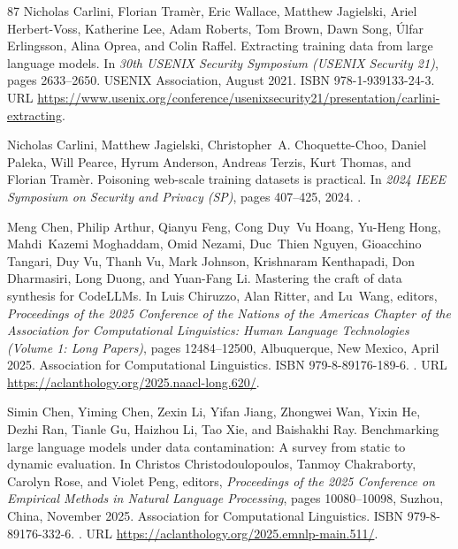 \begin{thebibliography}{87}
Nicholas Carlini, Florian Tram{\`e}r, Eric Wallace, Matthew Jagielski, Ariel Herbert-Voss, Katherine Lee, Adam Roberts, Tom Brown, Dawn Song, {\'U}lfar Erlingsson, Alina Oprea, and Colin Raffel.
\newblock Extracting training data from large language models.
\newblock In \emph{30th USENIX Security Symposium (USENIX Security 21)}, pages 2633--2650. USENIX Association, August 2021.
\newblock ISBN 978-1-939133-24-3.
\newblock URL \url{https://www.usenix.org/conference/usenixsecurity21/presentation/carlini-extracting}.

Nicholas Carlini, Matthew Jagielski, Christopher~A. Choquette-Choo, Daniel Paleka, Will Pearce, Hyrum Anderson, Andreas Terzis, Kurt Thomas, and Florian Tramèr.
\newblock Poisoning web-scale training datasets is practical.
\newblock In \emph{2024 IEEE Symposium on Security and Privacy (SP)}, pages 407--425, 2024.
\newblock {}.

Meng Chen, Philip Arthur, Qianyu Feng, Cong Duy~Vu Hoang, Yu-Heng Hong, Mahdi~Kazemi Moghaddam, Omid Nezami, Duc~Thien Nguyen, Gioacchino Tangari, Duy Vu, Thanh Vu, Mark Johnson, Krishnaram Kenthapadi, Don Dharmasiri, Long Duong, and Yuan-Fang Li.
\newblock Mastering the craft of data synthesis for {C}ode{LLM}s.
\newblock In Luis Chiruzzo, Alan Ritter, and Lu~Wang, editors, \emph{Proceedings of the 2025 Conference of the Nations of the Americas Chapter of the Association for Computational Linguistics: Human Language Technologies (Volume 1: Long Papers)}, pages 12484--12500, Albuquerque, New Mexico, April 2025{}. Association for Computational Linguistics.
\newblock ISBN 979-8-89176-189-6.
\newblock {}.
\newblock URL \url{https://aclanthology.org/2025.naacl-long.620/}.

Simin Chen, Yiming Chen, Zexin Li, Yifan Jiang, Zhongwei Wan, Yixin He, Dezhi Ran, Tianle Gu, Haizhou Li, Tao Xie, and Baishakhi Ray.
\newblock Benchmarking large language models under data contamination: A survey from static to dynamic evaluation.
\newblock In Christos Christodoulopoulos, Tanmoy Chakraborty, Carolyn Rose, and Violet Peng, editors, \emph{Proceedings of the 2025 Conference on Empirical Methods in Natural Language Processing}, pages 10080--10098, Suzhou, China, November 2025{}. Association for Computational Linguistics.
\newblock ISBN 979-8-89176-332-6.
\newblock {}.
\newblock URL \url{https://aclanthology.org/2025.emnlp-main.511/}.


\end{thebibliography}
